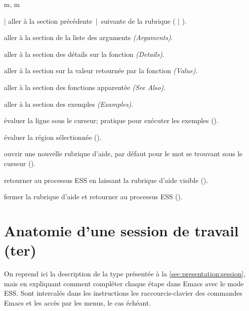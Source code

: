 \begin{ttscript}{m, m}
\item[\code{p} | \code{n}] aller à la section précédente~|~suivante de
  la rubrique \newline
  ( |
  ).
\item[\code{s a}] aller à la section de la liste des arguments \emph{(Arguments)}.
\item[\code{s D}] aller à la section des détails sur la fonction \emph{(Details)}.
\item[\code{s v}] aller à la section sur la valeur retournée par la
  fonction \emph{(Value)}.
\item[\code{s s}] aller à la section des fonctions apparentée \emph{(See Also)}.
\item[\code{s e}] aller à la section des exemples \emph{(Examples)}.
\item[\code{l}] évaluer la ligne sous le curseur; pratique pour
  exécuter les exemples \newline
  ().
\item[\code{r}] évaluer la région sélectionnée ().
\item[\code{h}] ouvrir une nouvelle rubrique d'aide, par défaut pour
  le mot se trouvant sous le curseur
  ().
\item[\code{q}] retourner au processus ESS en laissant la rubrique
  d'aide visible \newline
  ().
\item[\code{x}] fermer la rubrique d'aide et retourner au processus
  ESS \newline
  ().
\end{ttscript}



\section{Anatomie d'une session de travail (ter)}
\label{sec:emacs+ess:session}

On reprend ici la description de la type présentée à la
\autoref{sec:presentation:session}, mais en expliquant comment
compléter chaque étape dans Emacs avec le mode ESS. Sont intercalés
dans les instructions les raccourcis-clavier des commandes Emacs et
les accès par les menus, le cas échéant.

